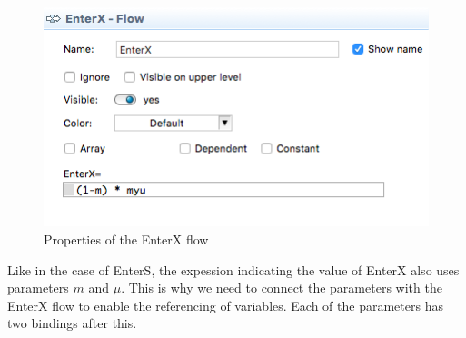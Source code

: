 \begin{figure}[H]
  \centering
  \includegraphics[height=0.3\textwidth]{img/screens/society/society17}
  \caption{Properties of the EnterX flow}
\end{figure}

Like in the case of EnterS, the expession indicating the value of EnterX also uses parameters $m$ and $\mu$. This is why we need to connect the parameters with the EnterX flow to enable the referencing of variables. Each of the parameters has two bindings after this.

